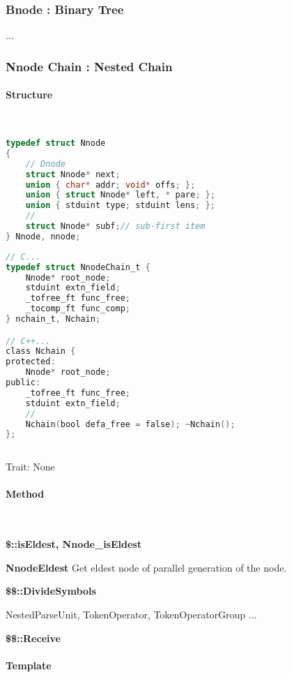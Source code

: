 \subsubsection{Bnode : Binary Tree}

...

\subsubsection{Nnode Chain : Nested Chain}

\paragraph{Structure} \

\lstset{style=GlobalC}
\begin{lstlisting}[language=C]
typedef struct Nnode
{
	// Dnode
	struct Nnode* next;
	union { char* addr; void* offs; };
	union { struct Nnode* left, * pare; };
	union { stduint type; stduint lens; };
	//
	struct Nnode* subf;// sub-first item
} Nnode, nnode;
\end{lstlisting}

\lstset{style=GlobalC}
\begin{lstlisting}[language=C]
// C...
typedef struct NnodeChain_t {
	Nnode* root_node;
	stduint extn_field;
	_tofree_ft func_free;
	_tocomp_ft func_comp;
} nchain_t, Nchain;

// C++...
class Nchain {
protected:
	Nnode* root_node;
public:
	_tofree_ft func_free;
	stduint extn_field;
	//
	Nchain(bool defa_free = false); ~Nchain();
};
	
\end{lstlisting}

Trait: None

\paragraph{Method} \


\textbf{\$::isEldest, Nnode\_isEldest}

\textbf{NnodeEldest}
Get eldest node of parallel generation of the node.

\textbf{\$\$::DivideSymbols}

NestedParseUnit, TokenOperator, TokenOperatorGroup ...


\textbf{\$\$::Receive}


\paragraph{Template} \

